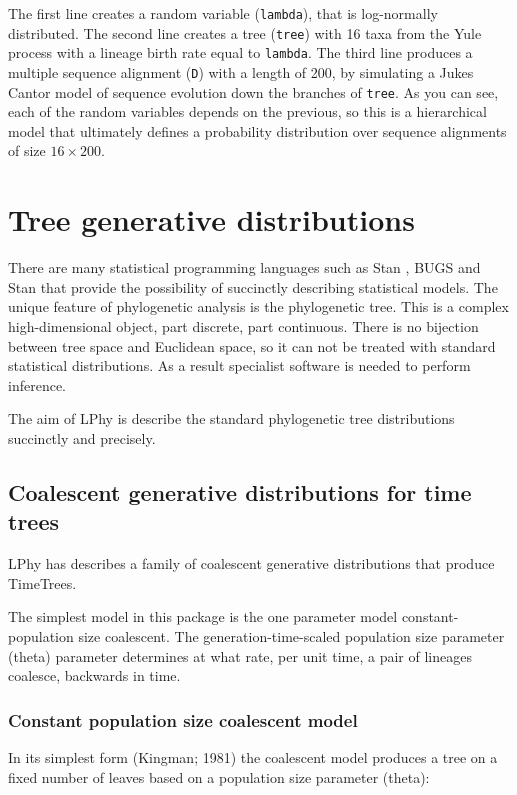 \documentclass[11pt]{article}
\begin{document}
The first line creates a random variable (\texttt{lambda}), that is log-normally distributed. The second line creates a tree (\texttt{tree}) with 16 taxa from the Yule process with a lineage birth rate equal to \texttt{lambda}. The third line produces a multiple sequence alignment (\texttt{D}) with a length of 200, by simulating a Jukes Cantor model of sequence evolution down the branches of  \texttt{tree}. As you can see, each of the random variables depends on the previous, so this is a hierarchical model that ultimately defines a probability distribution over sequence alignments of size $16 \times 200$.

\section{Tree generative distributions}

There are many statistical programming languages such as Stan \cite{carpenter2017stan}, BUGS and Stan that provide the possibility of succinctly describing statistical models. The unique feature of phylogenetic analysis is the phylogenetic tree. This is a complex high-dimensional object, part discrete, part continuous. There is no bijection between tree space and Euclidean space, so it can not be treated with standard statistical distributions. As a result specialist software is needed to perform inference.

The aim of LPhy is describe the standard phylogenetic tree distributions succinctly and precisely.

\subsection{Coalescent generative distributions for time trees}

LPhy has describes a family of coalescent generative distributions that produce TimeTrees.

The simplest model in this package is the one parameter model constant-population size coalescent.
The generation-time-scaled population size parameter (theta) parameter determines at
what rate, per unit time, a pair of lineages coalesce, backwards in time.

\subsubsection{Constant population size coalescent model}

In its simplest form (Kingman; 1981) the coalescent model produces a tree on a fixed number of leaves based on a population size
parameter (theta):
\end{document}
